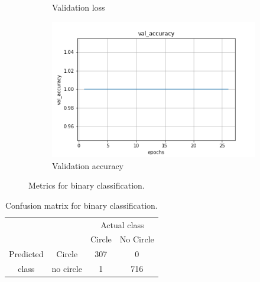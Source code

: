 \documentclass{article}
\begin{document}
\begin{figure}
\begin{subfigure}[b]{0.45\textwidth}
    \caption{Validation loss}
  \end{subfigure}
%
\begin{subfigure}[b]{0.45\textwidth}
    \centering
    \includegraphics[totalheight=4cm]{circle_id/binary/plotval_accuracy.png}
    \caption{Validation accuracy}
  \end{subfigure}
\caption{\label{fig:binarymetrics} Metrics for binary classification.}
\end{figure}
%
\begin{table}
\begin{center}
  \begin{tabular}{cccc}
    \cline{3-4}
    & & \multicolumn{2}{|c|}{Actual class}  \\
    \cline{3-4}
    & & \multicolumn{1}{|c|}{Circle} &  \multicolumn{1}{|c|}{No Circle}\\
    \hline
    \multicolumn{1}{|c}{Predicted} & \multicolumn{1}{|c|}{Circle} & \multicolumn{1}{|c|}{307} & \multicolumn{1}{|c|}{0} \\
    \cline{2-4}
    \multicolumn{1}{|c}{class} & \multicolumn{1}{|c|}{no circle} & \multicolumn{1}{|c|}{1} & \multicolumn{1}{|c|}{716}\\
    \hline
  \end{tabular}
\end{center}
\caption{\label{tab:confusionbinary} Confusion matrix for binary classification.}
\end{table}
%
\end{document}
